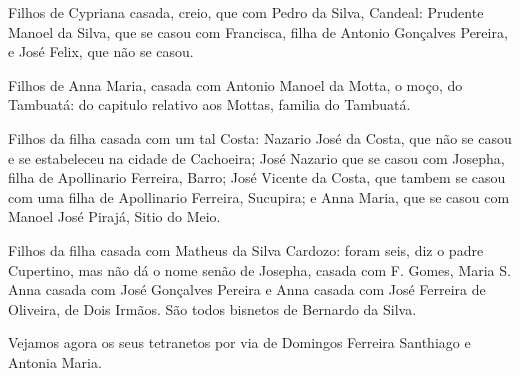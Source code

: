 Filhos de Cypriana casada, creio, que com Pedro da Silva, Candeal: Prudente Manoel da Silva, que se casou com Francisca, filha de Antonio Gonçalves Pereira, e José Felix, que não se casou.

Filhos de Anna Maria, casada com Antonio Manoel da Motta, o moço, do Tambuatá: do capitulo relativo aos Mottas, familia do Tambuatá.

Filhos da filha casada com um tal Costa: Nazario José da Costa, que não se casou e se estabeleceu na cidade de Cachoeira; José Nazario que se casou com Josepha, filha de Apollinario Ferreira, Barro; José Vicente da Costa, que tambem se casou com uma filha de Apollinario Ferreira, Sucupira; e Anna Maria, que se casou com Manoel José Pirajá, Sitio do Meio.

Filhos da filha casada com Matheus da Silva Cardozo: foram seis, diz o padre Cupertino, mas não dá o nome senão de Josepha, casada com F. Gomes, Maria S. Anna casada com José Gonçalves Pereira e Anna casada com José Ferreira de Oliveira, de Dois Irmãos. São todos bisnetos de Bernardo da Silva.

Vejamos agora os seus tetranetos por via de Domingos Ferreira Santhiago e Antonia Maria.

